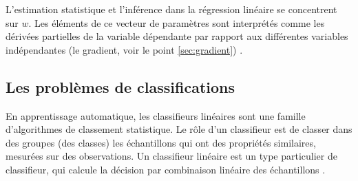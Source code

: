 	
	L'estimation statistique et l'inférence dans la régression linéaire se concentrent sur $w$. Les éléments de ce vecteur de paramètres sont interprétés comme les dérivées partielles de la variable dépendante par rapport aux différentes variables indépendantes (le gradient, voir le point \ref{sec:gradient}) \cite{darlington2016regression}.
	
	
	
	
	
	
	
	\subsection{Les problèmes de classifications} \label{sec:classificarion_problem}
	En apprentissage automatique, les classifieurs linéaires sont une famille d'algorithmes de classement statistique. Le rôle d'un classifieur est de classer dans des groupes (des classes) les échantillons qui ont des propriétés similaires, mesurées sur des observations. Un classifieur linéaire est un type particulier de classifieur, qui calcule la décision par combinaison linéaire des échantillons \cite{antoine2018apprentissage}.
	
